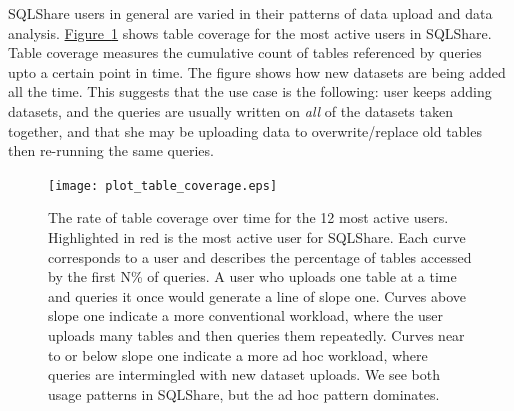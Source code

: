 \documentclass{sig-alternate}
\newcommand{\figref}[1]{\hyperref[#1]{Figure~\ref*{#1}}}
\newcommand{\sqlshare}{SQLShare}
\begin{document}
\sqlshare{} users in general are varied in their patterns of data upload and data analysis.
\figref{fig:tablecoveragetopusers} shows table coverage for the most active users in \sqlshare{}. Table coverage measures the cumulative count of tables referenced by queries upto a certain point in time. The figure shows how new datasets are being added all the time.
This suggests that the use case is the following: user keeps adding datasets, and the queries are usually written on \emph{all} of the datasets taken together, and that she may be uploading data to overwrite/replace old tables then re-running the same queries.

\begin{figure}[h]
\texttt{[image: plot\_table\_coverage.eps]}
\vspace{-10pt}
\caption{The rate of table coverage over time for the 12 most active users. 
Highlighted in red is the most active user for \sqlshare{}. 
Each curve corresponds to a user and describes the percentage of tables accessed by the first N\% of queries. A user who uploads one table at a time and queries it once would generate a line of slope one. Curves above slope one indicate a more conventional workload, where the user uploads many tables and then queries them repeatedly.  Curves near to or below slope one indicate a more ad hoc workload, where queries are intermingled with new dataset uploads. We see both usage patterns in \sqlshare{}, but the ad hoc pattern dominates.}
\label{fig:tablecoveragetopusers}
\vspace{-10pt}
\end{figure}
\end{document}
